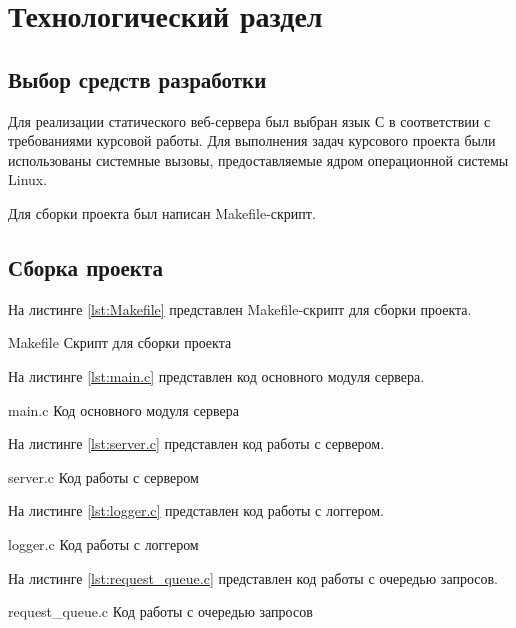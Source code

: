 \chapter{Технологический раздел}

\section{Выбор средств разработки}

Для реализации статического веб-сервера был выбран язык С в соответствии с требованиями курсовой работы. Для выполнения задач курсового проекта были использованы системные вызовы, предоставляемые ядром операционной системы Linux.

Для сборки проекта был написан Makefile-скрипт.

\section{Сборка проекта}

На листинге \ref{lst:Makefile} представлен Makefile-скрипт для сборки проекта.

    {Makefile}
    {Скрипт для сборки проекта}

\clearpage

На листинге \ref{lst:main.c} представлен код основного модуля сервера.

    {main.c}
    {Код основного модуля сервера}

На листинге \ref{lst:server.c} представлен код работы с сервером.

    {server.c}
    {Код работы с сервером}

На листинге \ref{lst:logger.c} представлен код работы с логгером.

    {logger.c}
    {Код работы с логгером}

На листинге \ref{lst:request_queue.c} представлен код работы с очередью запросов.

    {request_queue.c}
    {Код работы с очередью запросов}
